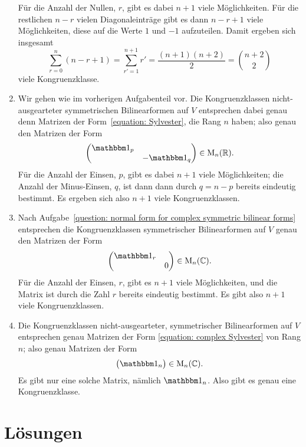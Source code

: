 \documentclass[a4paper, 10pt]{scrartcl}
\begin{document}
\begin{solution}
\begin{enumerate}
      Für die Anzahl der Nullen, $r$, gibt es dabei $n + 1$ viele Möglichkeiten.
      Für die restlichen $n - r$ vielen Diagonaleinträge gibt es dann $n - r + 1$ viele Möglichkeiten, diese auf die Werte $1$ und $-1$ aufzuteilen.
      Damit ergeben sich insgesamt
      \[
        \sum_{r=0}^n (n - r + 1)
        = \sum_{r' = 1}^{n+1} r'
        = \frac{(n+1)(n+2)}{2}
        = \binom{n+2}{2}
      \]
      viele Kongruenzklasse.
    \item
      Wir gehen wie im vorherigen Aufgabenteil vor.
      Die Kongruenzklassen nicht-aus\-ge\-arte\-ter symmetrischen Bilinearformen auf $V$ entsprechen dabei genau denn Matrizen der Form~\eqref{equation: Sylvester}, die Rang $n$ haben;
      also genau den Matrizen der Form
      \[
        \begin{pmatrix}
          \Id_p &         \\
                & -\Id_q
        \end{pmatrix}
        \in \matrices{n}{\Real}.
      \]
      Für die Anzahl der Einsen, $p$, gibt es dabei $n + 1$ viele Möglichkeiten;
      die Anzahl der Minus-Einsen, $q$, ist dann dann durch $q = n - p$ bereits eindeutig bestimmt.
      Es ergeben sich also $n + 1$ viele Kongruenzklassen.
    \item
      Nach Aufgabe~\ref{question: normal form for complex symmetric bilinear forms} entsprechen die Kongruenzklassen symmetrischer Bilinearformen auf $V$ genau den Matrizen der Form
      \begin{equation}
        \label{equation: complex Sylvester}
        \begin{pmatrix}
          \Id_r &   \\
                & 0
        \end{pmatrix}
        \in \matrices{n}{\Complex}.
      \end{equation}
      Für die Anzahl der Einsen, $r$, gibt es $n + 1$ viele Möglichkeiten, und die Matrix ist durch die Zahl $r$ bereits eindeutig bestimmt.
      Es gibt also $n + 1$ viele Kongruenzklassen.
    \item
      Die Kongruenzklassen nicht-ausgearteter, symmetrischer Bilinearformen auf $V$ entsprechen genau Matrizen der Form \eqref{equation: complex Sylvester} von Rang $n$;
      also genau Matrizen der Form
      \[
        \begin{pmatrix}
          \Id_n
        \end{pmatrix}
        \in \matrices{n}{\Complex}.
      \]
      Es gibt nur eine solche Matrix, nämlich $\Id_n$.
      Also gibt es genau eine Kongruenzklasse.
  \end{enumerate}
\end{solution}





\pagebreak
\section*{Lösungen}



\printsolutions
\end{document}
